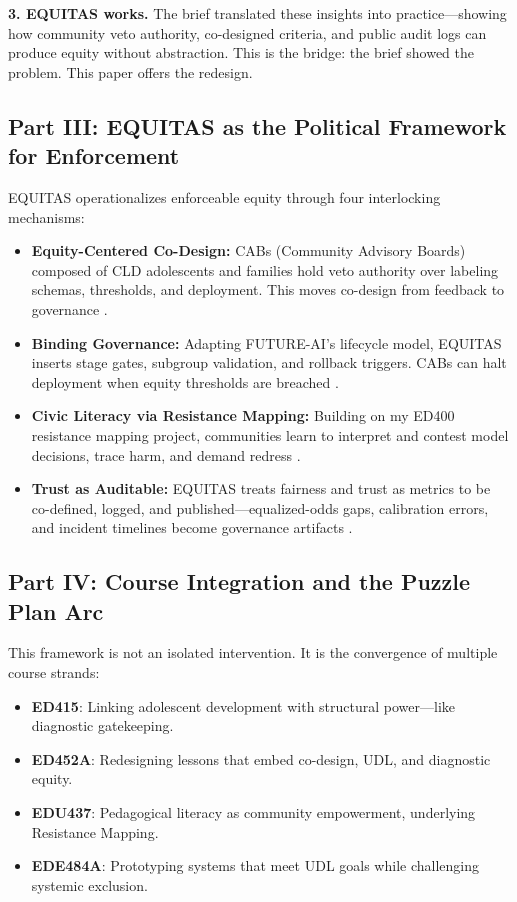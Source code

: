 \documentclass[12pt,a4paper]{article}
\begin{document}
\textbf{3. EQUITAS works.} The brief translated these insights into practice—showing how community veto authority, co-designed criteria, and public audit logs can produce equity without abstraction. This is the bridge: the brief showed the problem. This paper offers the redesign.

\subsection{Part III: EQUITAS as the Political Framework for Enforcement}

EQUITAS operationalizes enforceable equity through four interlocking mechanisms:

\begin{itemize}
    \setlength\itemsep{0.1em}
  \item \textbf{Equity-Centered Co-Design:} CABs (Community Advisory Boards) composed of CLD adolescents and families hold veto authority over labeling schemas, thresholds, and deployment. This moves co-design from feedback to governance \citep{Nadarzynski2024}.
  
  \item \textbf{Binding Governance:} Adapting FUTURE-AI’s lifecycle model, EQUITAS inserts stage gates, subgroup validation, and rollback triggers. CABs can halt deployment when equity thresholds are breached \citep{Lekadir2025, Chen2023}.
  
  \item \textbf{Civic Literacy via Resistance Mapping:} Building on my ED400 resistance mapping project, communities learn to interpret and contest model decisions, trace harm, and demand redress \citep{GarciaBautista2025RMP}.
  
  \item \textbf{Trust as Auditable:} EQUITAS treats fairness and trust as metrics to be co-defined, logged, and published—equalized-odds gaps, calibration errors, and incident timelines become governance artifacts \citep{Sagona2025}.
\end{itemize}

\subsection{Part IV: Course Integration and the Puzzle Plan Arc}

This framework is not an isolated intervention. It is the convergence of multiple course strands:

\begin{itemize}
    \setlength\itemsep{0.1em}
  \item \textbf{ED415}: Linking adolescent development with structural power—like diagnostic gatekeeping.
  \item \textbf{ED452A}: Redesigning lessons that embed co-design, UDL, and diagnostic equity.
  \item \textbf{EDU437}: Pedagogical literacy as community empowerment, underlying Resistance Mapping.
  \item \textbf{EDE484A}: Prototyping systems that meet UDL goals while challenging systemic exclusion.
\end{itemize}
\end{document}
